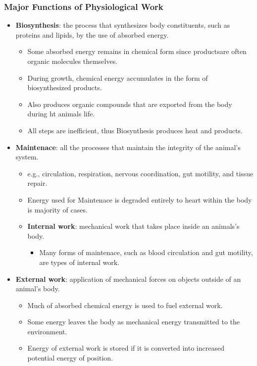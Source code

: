 \documentclass[12pt,a4paper]{article}
\begin{document}
\begin{itemize}
    \subsubsection{Major Functions of Physiological Work}
    \begin{itemize}
        \item \textbf{Biosynthesis}: the process that synthesizes body constituents, such as proteins and lipids, by the use of absorbed energy.
            \begin{itemize}
                \item Some absorbed energy remains in chemical form since productsare often organic molecules themselves.
                \item During growth, chemical energy accumulates in the form of biosynthesized products.
                \item Also produces organic compounds that are exported from the body during ht animals life.
                \item All steps are inefficient, thus Biosynthesis produces heat and products.
            \end{itemize}
        \item \textbf{Maintenace}: all the processes that maintain the integrity of the animal's system.
            \begin{itemize}
                \item e.g., circulation, respiration, nervous coordination, gut motility, and tissue repair.
                \item Energy used for Maintenace is degraded entirely to heart within the body is majority of cases.
                \item \textbf{Internal work}: mechanical work that takes place inside an animals's body.
                    \begin{itemize}
                        \item Many forms of maintenace, such as blood circulation and gut motility, are types of internal work.
                    \end{itemize}
            \end{itemize}
        \item \textbf{External work}: application of mechanical forces on objects outside of an animal's body. 
            \begin{itemize}
                \item Much of absorbed chemical energy is used to fuel external work.
                \item Some energy leaves the body as mechanical energy transmitted to the environment.
                \item Energy of external work is stored if it is converted into increased potential energy of position.
            \end{itemize}
    \end{itemize}
\end{itemize}
\end{document}
